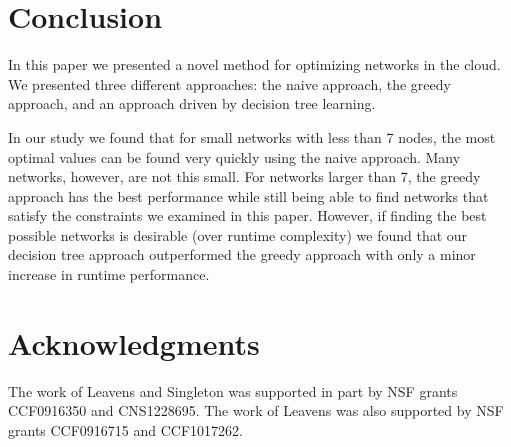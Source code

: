 \section{Conclusion} \label{sec:conclusion}
In this paper we presented a novel method for optimizing networks in the cloud. We presented three different approaches: the naive approach, the greedy approach, and an approach driven by decision tree learning.

In our study we found that for small networks with less than 7 nodes, the most optimal values can be found very quickly using the naive approach. Many networks, however, are not this small. For networks larger than 7, the greedy approach has the best performance while still being able to find networks that satisfy the constraints we examined in this paper. However, if finding the best possible networks is desirable (over runtime complexity) we found that our decision tree approach outperformed the greedy approach with only a minor
increase in runtime performance.

\section{Acknowledgments} \label{sec:acknowledgments}
The work of Leavens and Singleton was supported in part by NSF grants CCF0916350 and CNS1228695. The work of Leavens was also supported by NSF grants CCF0916715 and CCF1017262.


